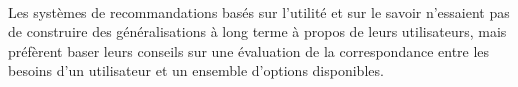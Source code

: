 	\paragraph{}
Les systèmes de recommandations basés sur l’utilité et sur le savoir n’essaient pas de construire des généralisations à long terme à propos de leurs utilisateurs, mais préfèrent baser leurs conseils sur une évaluation de la correspondance entre les besoins d’un utilisateur et un ensemble d’options disponibles.
